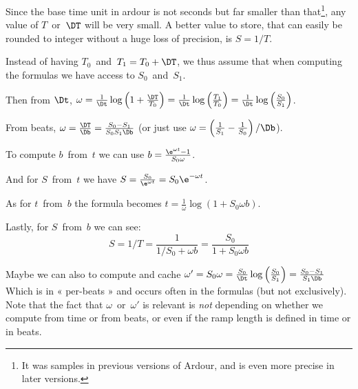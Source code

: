 \documentclass[10pt]{article}
\begin{document}
\everymath{\displaystyle}

Since the base time unit in ardour is not seconds but far smaller than
that\footnote{It was samples in previous versions of Ardour, and is even more
precise in later versions.}, any value of $T$~or~$\DT$ will be very small. A
better value to store, that can easily be rounded to integer without a huge
loss of precision, is $S = 1/T$.

Instead of having $T_0$~and~$T_1 = T_0 + \DT$, we thus assume that when
computing the formulas we have access to $S_0$~and~$S_1$.

Then from $\Dt$,
$\omega = \frac{1}{\Dt}\log\left(1 + \frac{\DT}{T_0}\right)
 = \frac{1}{\Dt}\log\left(\frac{T_1}{T_0}\right)
 = \frac{1}{\Dt}\log\left(\frac{S_0}{S_1}\right)$.

From beats, $\omega = \frac{\DT}{\Db} = \frac{S_0 - S_1}{S_0S_1\Db}$ (or just
use $\omega = \left( \frac{1}{S_1} - \frac{1}{S_0} \right) / \Db$).

To compute $b$~from~$t$ we can use
$b = \frac{\e^{\omega t}-1}{S_0 \omega}$.

And for $S$~from~$t$ we have
$S = \frac{S_0}{\e^{\omega t}} = S_0\e^{-\omega t}$.

As for $t$~from~$b$ the formula becomes
$t = \frac{1}{\omega} \log \left( 1 + S_0 \omega b \right)$.

Lastly, for $S$~from~$b$ we can see:
\[ S = 1/T = \frac{1}{1/S_0 + \omega b} = \frac{S_0}{1+S_0\omega b}\]

Maybe we can also to compute and cache
$\omega' = S_0 \omega = \frac{S_0}{\Dt}\log\left(\frac{S_0}{S_1}\right)
    = \frac{S_0 - S_1}{S_1\Db}$
Which is in « per-beats » and occurs often in the formulas (but not
exclusively). Note that the fact that $\omega$~or~$\omega'$ is relevant is
\emph{not} depending on whether we compute from time or from beats, or even if
the ramp length is defined in time or in beats.
\end{document}
